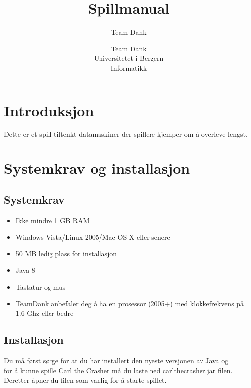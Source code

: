 \documentclass[paper=a4]{article}
\title{Spillmanual}
\author{Team Dank}
\begin{document}
\author{Team Dank \\
Universitetet i Bergern \\
Informatikk}
\maketitle

\newpage

\section{Introduksjon}
Dette er et spill tiltenkt datamaskiner der spillere kjemper om å overleve lengst.


\section{Systemkrav og installasjon}

\subsection{Systemkrav}
\begin{itemize}
	\item{Ikke mindre 1 GB RAM}
	\item{Windows Vista/Linux 2005/Mac OS X eller senere}
	\item{50 MB ledig plass for installasjon}
	\item{Java 8}
	\item{Tastatur og mus}
	\item{TeamDank anbefaler deg å ha en prosessor (2005+) med klokkefrekvens på 1.6 Ghz eller bedre}
\end{itemize}

\subsection{Installasjon}
Du må først sørge for at du har installert den nyeste versjonen av Java og \\
for å kunne spille Carl the Crasher må du laste ned carlthecrasher.jar filen. \\
Deretter åpner du filen som vanlig for å starte spillet.  
\newpage
\end{document}
